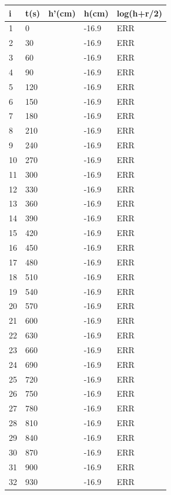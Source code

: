 \documentclass[11pt,a4paper]{article}
\begin{document}
\begin{table}[h]
\begin{tabular}{|l|l|l|l|l|}
\hline
i & t(s) & h'(cm) & h(cm) & log(h+r/2) \\ \hline
1 & 0 &  & -16.9 & ERR \\ \hline
2 & 30 &  & -16.9 & ERR \\ \hline
3 & 60 &  & -16.9 & ERR \\ \hline
4 & 90 &  & -16.9 & ERR \\ \hline
5 & 120 &  & -16.9 & ERR \\ \hline
6 & 150 &  & -16.9 & ERR \\ \hline
7 & 180 &  & -16.9 & ERR \\ \hline
8 & 210 &  & -16.9 & ERR \\ \hline
9 & 240 &  & -16.9 & ERR \\ \hline
10 & 270 &  & -16.9 & ERR \\ \hline
11 & 300 &  & -16.9 & ERR \\ \hline
12 & 330 &  & -16.9 & ERR \\ \hline
13 & 360 &  & -16.9 & ERR \\ \hline
14 & 390 &  & -16.9 & ERR \\ \hline
15 & 420 &  & -16.9 & ERR \\ \hline
16 & 450 &  & -16.9 & ERR \\ \hline
17 & 480 &  & -16.9 & ERR \\ \hline
18 & 510 &  & -16.9 & ERR \\ \hline
19 & 540 &  & -16.9 & ERR \\ \hline
20 & 570 &  & -16.9 & ERR \\ \hline
21 & 600 &  & -16.9 & ERR \\ \hline
22 & 630 &  & -16.9 & ERR \\ \hline
23 & 660 &  & -16.9 & ERR \\ \hline
24 & 690 &  & -16.9 & ERR \\ \hline
25 & 720 &  & -16.9 & ERR \\ \hline
26 & 750 &  & -16.9 & ERR \\ \hline
27 & 780 &  & -16.9 & ERR \\ \hline
28 & 810 &  & -16.9 & ERR \\ \hline
29 & 840 &  & -16.9 & ERR \\ \hline
30 & 870 &  & -16.9 & ERR \\ \hline
31 & 900 &  & -16.9 & ERR \\ \hline
32 & 930 &  & -16.9 & ERR \\ \hline
\end{tabular}
\end{table}
\end{document}
